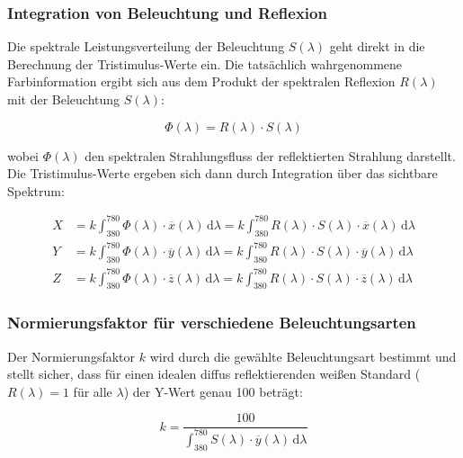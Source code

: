 \subsubsection{Integration von Beleuchtung und Reflexion}

Die spektrale Leistungsverteilung der Beleuchtung $S(\lambda)$ geht direkt in die Berechnung der Tristimulus-Werte ein. Die tatsächlich wahrgenommene Farbinformation ergibt sich aus dem Produkt der spektralen Reflexion $R(\lambda)$ mit der Beleuchtung $S(\lambda)$:

\begin{equation}
\Phi(\lambda) = R(\lambda) \cdot S(\lambda)
\label{eq:spektraler_strahlungsfluss}
\end{equation}

wobei $\Phi(\lambda)$ den spektralen Strahlungsfluss der reflektierten Strahlung darstellt. Die Tristimulus-Werte ergeben sich dann durch Integration über das sichtbare Spektrum:

\begin{align}
X &= k \int_{380}^{780} \Phi(\lambda) \cdot \overline{x}(\lambda) \, \mathrm{d}\lambda = k \int_{380}^{780} R(\lambda) \cdot S(\lambda) \cdot \overline{x}(\lambda) \, \mathrm{d}\lambda \\
Y &= k \int_{380}^{780} \Phi(\lambda) \cdot \overline{y}(\lambda) \, \mathrm{d}\lambda = k \int_{380}^{780} R(\lambda) \cdot S(\lambda) \cdot \overline{y}(\lambda) \, \mathrm{d}\lambda \\
Z &= k \int_{380}^{780} \Phi(\lambda) \cdot \overline{z}(\lambda) \, \mathrm{d}\lambda = k \int_{380}^{780} R(\lambda) \cdot S(\lambda) \cdot \overline{z}(\lambda) \, \mathrm{d}\lambda
\end{align}

\subsubsection{Normierungsfaktor für verschiedene Beleuchtungsarten}

Der Normierungsfaktor $k$ wird durch die gewählte Beleuchtungsart bestimmt und stellt sicher, dass für einen idealen diffus reflektierenden weißen Standard ($R(\lambda) = 1$ für alle $\lambda$) der Y-Wert genau 100 beträgt:

\begin{equation}
k = \frac{100}{\int_{380}^{780} S(\lambda) \cdot \overline{y}(\lambda) \, \mathrm{d}\lambda}
\label{eq:normierungsfaktor_beleuchtung}
\end{equation}

